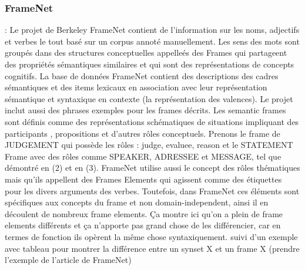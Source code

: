 \subsubsection{FrameNet} : Le projet de Berkeley FrameNet contient de l'information sur les noms, adjectifs et verbes le tout basé sur un corpus annoté manuellement. Les sens des mots sont groupés dans des structures conceptuelles appelleés des Frames qui partageent des propriétés sémantiques similaires et qui sont des représentations de concepts cognitifs. La base de données FrameNet contient des descriptions des cadres sémantiques et des items lexicaux en association avec leur représentation sémantique et syntaxique en contexte (la représentation des valences). Le projet inclut aussi des phrases exemples pour les frames décrits. Les semantic frames sont définis comme des représentations schématiques de situations impliquant des participants , propositions et d'autres rôles conceptuels. Prenons le frame de JUDGEMENT qui possède les rôles : judge, evaluee, reason et le STATEMENT Frame avec des rôles comme SPEAKER, ADRESSEE et MESSAGE, tel que démontré en (2) et en (3). FrameNet utilise aussi le concept des rôles thématiques mais qu'ils appellent des Frames Elements qui agissent comme des étiquettes pour les divers arguments des verbes. Toutefois, dans FrameNet ces éléments sont spécifiques aux concepts du frame et non domain-independent, ainsi il en découlent de nombreux frame elements. Ça montre ici qu'on a plein de frame elements différents et ça n'apporte pas grand chose de les différencier, car en termes de fonction ils opèrent la même chose syntaxiquement.
suivi d'un exemple avec tableau pour montrer la différence entre un synset X et un frame X (prendre l'exemple de l'article de FrameNet)

